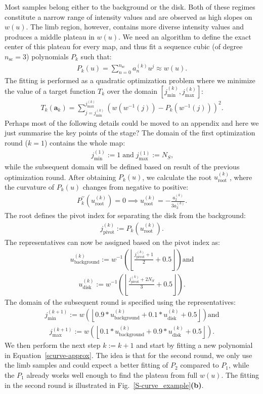 \documentclass{aa}
\newcommand{\fg}[1]{\textcolor{midblue}{#1}}
\newcommand{\eqnl}[2]{\begin{eqnarray}\label{#1}#2\end{eqnarray}}
\newcommand{\floor}[1]{\left\lfloor #1 \right\rfloor}
\newcommand{\s}[2]{{#1}_{\mathrm{#2}}}
\begin{document}
  Most samples belong either to the background or the disk. Both of these regimes constitute a narrow range of intensity 
  values and are observed as high slopes on $w(u)$. The limb region, however, contains more diverse intensity values and 
  produces a middle plateau in $w(u)$. We need an algorithm to define the exact center of this plateau for every map, and
  thus fit a sequence cubic (of degree $\s{n}{sc}=3$) polynomials $P_k$ such that:
  \eqnl{scurve-approx}{
  P_k(u) = \sum \limits_{n=0}^{\s{n}{sc}} a_n^{(k)} u^j \approx w(u) \text{.}
  }
  The fitting is performed as a quadratic optimization problem where we minimize the value of a target function $T_k$ over the domain $[\s{j}{min}^{(k)}, \s{j}{max}^{(k)}]$:
  \eqnl{scurve-target}{
  T_k(\bm{a}_k) = \sum \limits_{j = \s{j}{min}^{(k)}}^{\s{j}{max}^{(k)}} \left( w \left( w^{-1}(j) \right) - P_k \left( w^{-1}(j) \right) \right)^2 \text{.}
  }
  \fg{Perhaps most of the following details could be moved to an appendix and 
  here we just summarise the key points of the stage?}
  The domain of the first optimization round ($k=1$) contains the whole map:
  \eqnl{scurve-firstdomain}{
  \s{j}{min}^{(1)} := 1 \; \text{and} \; \s{j}{max}^{(1)} := N_S \text{,}
  }
  while the subsequent domain will be defined based on result of the previous optimization round. After obtaining 
  $P_k(u)$, we calculate the root $\s{u}{root}^{(k)}$, where the curvature of $P_k(u)$ changes from negative to 
  positive:
  \eqnl{scurve-root}{
  P_k^{\prime\prime}(\s{u}{root}^{(k)}) = 0 \implies \s{u}{root}^{(k)} = -\frac{a_2^{(k)}}{3 a_3^{(k)}} \text{.}
  }
  The root defines the pivot index for separating the disk from the background:
  \eqnl{scurve-pivot}{
  \s{j}{pivot}^{(k)} := P_k(\s{u}{root}^{(k)}) \text{.}
  }
  The representatives can now be assigned based on the pivot index as:
  \eqnl{scurve-background}{
  \s{u}{background}^{(k)} := w^{-1} \left( \floor{\frac{\s{j}{pivot}^{(k)} + 1}{2} + 0.5} \right) \text{and}
  }
  \eqnl{scurve-disk}{
  \s{u}{disk}^{(k)} := w^{-1} \left( \floor{\frac{\s{j}{pivot}^{(k)} + 2 N_S}{3} + 0.5} \right) \text{.}
  }
  The domain of the subsequent round is specified using the representatives:
  \eqnl{scurve-nextdomain-min}{
  \s{j}{min}^{(k+1)} := w \left( \floor{ 0.9 * \s{u}{background}^{(k)} + 0.1 * \s{u}{disk}^{(k)} + 0.5 } \right) \text{and}
  }
  \eqnl{scurve-nextdomain-max}{
  \s{j}{max}^{(k+1)} := w \left( \floor{ 0.1 * \s{u}{background}^{(k)} + 0.9 * \s{u}{disk}^{(k)} + 0.5 } \right) \text{.}
  }
  We then perform the next step $k := k+1$ and start by fitting a new polynomial in Equation~\ref{scurve-approx}. The 
  idea is that for the second round, we only use the limb samples and could expect a better fitting of $P_2$ compared to 
  $P_1$, while the $P_1$ already works well enough to find the plateau from full $w(u)$. The fitting in the second round is illustrated in Fig.~\ref{S-curve_example}{\bf(b)}.
\end{document}
